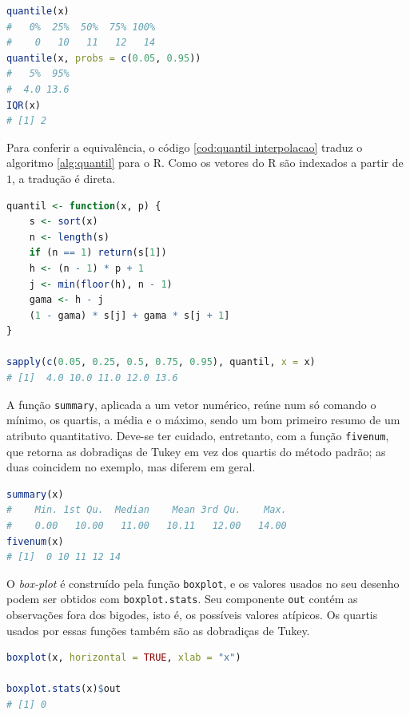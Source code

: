 \begin{lstlisting}[language=R, caption={Quantis e Intervalo Interquartílico}, label={cod:quantis}]
quantile(x)
#   0%  25%  50%  75% 100%
#    0   10   11   12   14
quantile(x, probs = c(0.05, 0.95))
#   5%  95%
#  4.0 13.6
IQR(x)
# [1] 2
\end{lstlisting}

Para conferir a equivalência, o código \ref{cod:quantil interpolacao} traduz o algoritmo
\ref{alg:quantil} para o R.
Como os vetores do R são indexados a partir de $1$, a tradução é direta.

\begin{lstlisting}[language=R, caption={Quantil Empírico por Interpolação}, label={cod:quantil interpolacao}]
quantil <- function(x, p) {
    s <- sort(x)
    n <- length(s)
    if (n == 1) return(s[1])
    h <- (n - 1) * p + 1
    j <- min(floor(h), n - 1)
    gama <- h - j
    (1 - gama) * s[j] + gama * s[j + 1]
}

sapply(c(0.05, 0.25, 0.5, 0.75, 0.95), quantil, x = x)
# [1]  4.0 10.0 11.0 12.0 13.6
\end{lstlisting}

A função \texttt{summary}, aplicada a um vetor numérico, reúne num só comando o mínimo,
os quartis, a média e o máximo, sendo um bom primeiro resumo de um atributo quantitativo.
Deve-se ter cuidado, entretanto, com a função \texttt{fivenum}, que retorna as dobradiças
de Tukey em vez dos quartis do método padrão; as duas coincidem no exemplo, mas diferem
em geral.

\begin{lstlisting}[language=R, caption={Resumo com \texttt{summary} e \texttt{fivenum}}, label={cod:summary}]
summary(x)
#    Min. 1st Qu.  Median    Mean 3rd Qu.    Max.
#    0.00   10.00   11.00   10.11   12.00   14.00
fivenum(x)
# [1]  0 10 11 12 14
\end{lstlisting}

O \textit{box-plot} é construído pela função \texttt{boxplot}, e os valores usados no seu
desenho podem ser obtidos com \texttt{boxplot.stats}.
Seu componente \texttt{out} contém as observações fora dos bigodes, isto é, os possíveis
valores atípicos.
Os quartis usados por essas funções também são as dobradiças de Tukey.

\begin{lstlisting}[language=R, caption={Box-plot e Valores Atípicos}, label={cod:boxplot}]
boxplot(x, horizontal = TRUE, xlab = "x")

boxplot.stats(x)$out
# [1] 0
\end{lstlisting}

